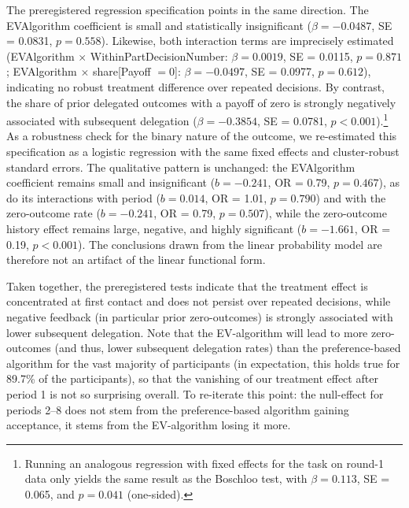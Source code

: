 \documentclass[a4paper, 12pt, fleqn]{article}
\theoremstyle{definition}
\newcommand{\inew}[1]{{\color{blue} #1\color{black}}}
\begin{document}
The preregistered regression specification points in the same direction. The EVAlgorithm coefficient is small and statistically insignificant ($\beta = -0.0487$, SE = 0.0831, $p = 0.558$). Likewise, both interaction terms are imprecisely estimated (EVAlgorithm $\times$ WithinPartDecisionNumber: $\beta = 0.0019$, SE = 0.0115, $p = 0.871$; EVAlgorithm $\times$ share[Payoff $= 0$]: $\beta = -0.0497$, SE = 0.0977, $p = 0.612$), indicating no robust treatment difference over repeated decisions. By contrast, the share of prior delegated outcomes with a payoff of zero is strongly negatively associated with subsequent delegation ($\beta = -0.3854$, SE = 0.0781, $p < 0.001$).\footnote{Running an analogous regression with fixed effects for the task on round-1 data only yields the same result as the Boschloo test, with $\beta = 0.113$, SE = 0.065, and $p = 0.041$ (one-sided).} \inew{As a robustness check for the binary nature of the outcome, we re-estimated this specification as a logistic regression with the same fixed effects and cluster-robust standard errors. The qualitative pattern is unchanged: the EVAlgorithm coefficient remains small and insignificant ($b = -0.241$, OR = 0.79, $p = 0.467$), as do its interactions with period ($b = 0.014$, OR = 1.01, $p = 0.790$) and with the zero-outcome rate ($b = -0.241$, OR = 0.79, $p = 0.507$), while the zero-outcome history effect remains large, negative, and highly significant ($b = -1.661$, OR = 0.19, $p < 0.001$). The conclusions drawn from the linear probability model are therefore not an artifact of the linear functional form.}

Taken together, the preregistered tests indicate that the treatment effect is concentrated at first contact and does not persist over repeated decisions, while negative feedback (in particular prior zero-outcomes) is strongly associated with lower subsequent delegation. Note that the EV-algorithm will lead to more zero-outcomes (and thus, lower subsequent delegation rates) than the preference-based algorithm for the vast majority of participants (in expectation, this holds true for 89.7\% of the participants), so that the vanishing of our treatment effect after period 1 is not so surprising overall. To re-iterate this point: the null-effect for periods 2--8 does not stem from the preference-based algorithm gaining acceptance, it stems from the EV-algorithm losing it more.
\end{document}
